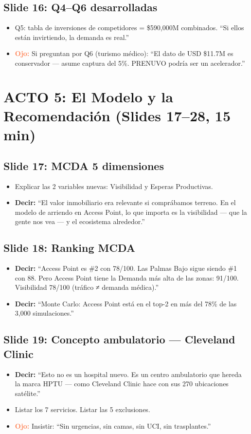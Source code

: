\documentclass[11pt, a4paper]{article}
\newcommand{\slide}[2]{\subsection{Slide #1: #2}}
\newcommand{\say}[1]{\textcolor{hptu}{\textbf{Decir:}} ``#1''}
\newcommand{\warn}[1]{\textcolor{coral}{\textbf{Ojo:}} #1}
\begin{document}
\slide{16}{Q4--Q6 desarrolladas}
\begin{itemize}[leftmargin=1cm]
  \item Q5: tabla de inversiones de competidores = \$590,000M combinados. ``Si ellos están invirtiendo, la demanda es real.''
  \item \warn{Si preguntan por Q6 (turismo médico): ``El dato de USD \$11.7M es conservador --- asume captura del 5\%. PRENUVO podría ser un acelerador.''}
\end{itemize}

\section{ACTO 5: El Modelo y la Recomendación (Slides 17--28, 15 min)}

\slide{17}{MCDA 5 dimensiones}
\begin{itemize}[leftmargin=1cm]
  \item Explicar las 2 variables nuevas: Visibilidad y Esperas Productivas.
  \item \say{El valor inmobiliario era relevante si comprábamos terreno. En el modelo de arriendo en Access Point, lo que importa es la visibilidad --- que la gente nos vea --- y el ecosistema alrededor.}
\end{itemize}

\slide{18}{Ranking MCDA}
\begin{itemize}[leftmargin=1cm]
  \item \say{Access Point es \#2 con 78/100. Las Palmas Bajo sigue siendo \#1 con 88. Pero Access Point tiene la Demanda más alta de las zonas: 91/100. Visibilidad 78/100 (tráfico ≠ demanda médica).}
  \item \say{Monte Carlo: Access Point está en el top-2 en más del 78\% de las 3,000 simulaciones.}
\end{itemize}

\slide{19}{Concepto ambulatorio --- Cleveland Clinic}
\begin{itemize}[leftmargin=1cm]
  \item \say{Esto no es un hospital nuevo. Es un centro ambulatorio que hereda la marca HPTU --- como Cleveland Clinic hace con sus 270 ubicaciones satélite.}
  \item Listar los 7 servicios. Listar las 5 exclusiones.
  \item \warn{Insistir: ``Sin urgencias, sin camas, sin UCI, sin trasplantes.''}
\end{itemize}
\end{document}
